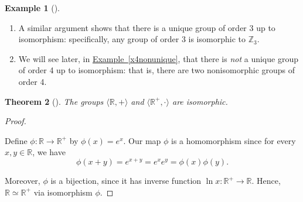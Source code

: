 \documentclass[10pt,]{book}
\theoremstyle{plain}
\newtheorem{theorem}{Theorem}[section]
\theoremstyle{definition}
\theoremstyle{definition}
\theoremstyle{definition}
\newtheorem{example}[theorem]{Example}
\theoremstyle{definition}
\numberwithin{equation}{section}
\newlength{\panelmax}
\def\Z{\mathbb{Z}}
\def\R{\mathbb{R}}
\begin{document}
\begin{example}[]
\begin{enumerate}
{%
\par\medskip\noindent
\begin{tabular}{@{}*{2}{c}@{}}
\begin{minipage}[c][\panelmax][t]{0.5\linewidth}\usebox{\panelboxItabular}\end{minipage}&
\begin{minipage}[c][\panelmax][t]{0.5\linewidth}\usebox{\panelboxJtabular}\end{minipage}\end{tabular}\\
}%
\par
Note that the first table looks exactly like the second table if we replace \(*\) with \(+\), each \(e\) with \(0\), and each \(a\) with \(1\). This shows that groups \(G\) and \(\Z_2\) have identical structures; more precisely, it shows that the function \(\phi\) from \(G\) to \(\Z_2\) defined by \(\phi(e)=0\) and \(\phi(a)=1\) is an isomorphism.  Since any group of order 2 is isomorphic to \(\Z_2\), using \hyperref[groupisoequiv]{Theorem~\ref{groupisoequiv}} we see that there is a unique group of order 2, up to isomorphism.%
\item\hypertarget{li-153}{}A similar argument shows that there is a unique group of order 3 up to isomorphism: specifically, any group of order 3 is isomorphic to \(\Z_3\).%
\item\hypertarget{li-154}{}We will see later, in \hyperref[x4nonunique]{Example~\ref{x4nonunique}}, that there is \emph{not} a unique group of order 4 up to isomorphism: that is, there are two nonisomorphic groups of order 4.%
\end{enumerate}
%
\end{example}
\begin{theorem}[{}]\label{theorem-17}
The groups \(\langle \R,+\rangle\) and \(\langle \R^+, \cdot\rangle\) are isomorphic.%
\end{theorem}
\begin{proof}\hypertarget{proof-18}{}
Define \(\phi:\R\to \R^+\) by \(\phi(x)=e^x\). Our map \(\phi\) is a homomorphism since for every \(x,y\in \R\), we have%
\begin{equation*}
\phi(x+y)=e^{x+y}=e^xe^y=\phi(x)\phi(y).
\end{equation*}
%
\par
Moreover, \(\phi\) is a bijection, since it has inverse function \(\ln x: \R^+\to \R\). Hence, \(\R \simeq \R^+\) via isomorphism \(\phi\).%
\end{proof}
\end{document}
